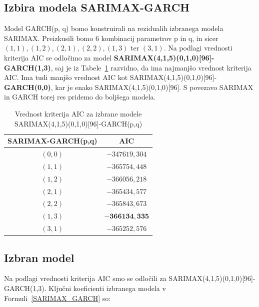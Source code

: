 \documentclass[a4paper, 11pt]{article}
\begin{document}

\subsection{Izbira modela SARIMAX-GARCH}

Model GARCH(p, q) bomo konstruirali na rezidualih izbranega modela SARIMAX. Preizkusili bomo $6$ kombinacij 
parametrov p in q, in sicer $(1,1), (1,2), (2,1), (2,2), (1,3)$ ter $(3,1)$. 
Na podlagi vrednosti kriterija AIC se odločimo za model \textbf{SARIMAX(4,1,5)(0,1,0)[96]-GARCH(1,3)}, saj
je iz Tabele~\ref{Tab:GARCH_AIC} razvidno, da ima najmanjšo vrednost kriterija AIC. Ima tudi manjšo vrednost 
AIC kot SARIMAX(4,1,5)(0,1,0)[96]-\textbf{GARCH(0,0)}, kar je enako SARIMAX(4,1,5)(0,1,0)[96]. S povezavo
SARIMAX in GARCH torej res pridemo do boljšega modela. 

\begin{table}[!ht]
    \centering
    \caption{Vrednost kriterija AIC za izbrane modele SARIMAX(4,1,5)(0,1,0)[96]-GARCH(p,q)}\par\medskip
    \label{Tab:GARCH_AIC}
    \begin{tabular}{c|c}
        SARIMAX-GARCH(p,q) & AIC \\ \hline
        $(0,0)$ & $-347619{,}304$ \\ 
        $(1,1)$ & $-365754{,}448$ \\ 
        $(1,2)$ & $-366056{,}218$ \\ 
        $(2,1)$ & $-365434{,}577$ \\ 
        $(2,2)$ & $-365843{,}673$ \\ 
        $(1,3)$ & $\mathbf{-366134{,}335}$ \\ 
        $(3,1)$ & $-365252{,}576$ \\ 
    \end{tabular}
\end{table}



\subsection{Izbran model}

Na podlagi vrednosti kriterija AIC smo se odločili za SARIMAX(4,1,5)(0,1,0)[96]-GARCH(1,3). 
Ključni koeficienti izbranega modela v Formuli~\eqref{SARIMAX_GARCH} so:
\end{document}
